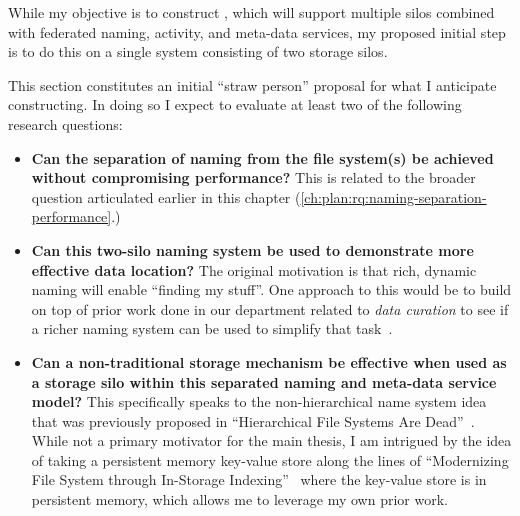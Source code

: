 While my objective is to construct \system, which will support multiple silos
combined with federated naming, activity, and meta-data services, my proposed
initial step is to do this on a single system consisting of two storage silos.

This section constitutes an initial ``straw person'' proposal for what I
anticipate constructing.  
In doing so I expect to evaluate at least two of the following research questions:

\begin{itemize}
    \item \textbf{Can the separation of naming from the file system(s) be achieved
              without compromising performance?} This is related to the broader question articulated earlier in this
          chapter (\autoref{ch:plan:rq:naming-separation-performance}.)

    \item \textbf{Can this two-silo naming system be used to demonstrate more effective
              data location?}  The original motivation is that rich, dynamic naming will
          enable ``finding my stuff''.  One approach to this would be to build on top
          of prior work done in our department related to \emph{data curation} to see
          if a richer naming system can be used to simplify that
          task~\cite{Vitale_2020}.

    \item \textbf{Can a non-traditional storage mechanism be effective when used as a storage silo
              within this separated naming and meta-data service model?}  This
          specifically speaks to the non-hierarchical name system idea that was
          previously proposed in ``Hierarchical File Systems Are
          Dead''~\cite{seltzer2009hierarchical}.  While not a primary motivator for
          the main thesis, I am intrigued by the idea of taking a persistent memory
          key-value store along the lines of ``Modernizing File System through
          In-Storage Indexing''~\cite{koo2021modernizing} where the key-value store is
          in persistent memory, which allows me to leverage my own prior
          work. 


\end{itemize}

